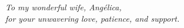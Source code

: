 \thispagestyle{empty}
\begin{center}
    \vspace*{0.5\textheight}
    \textit{To my wonderful wife, Angélica,\\
    for your unwavering love, patience, and support.}
\end{center}

